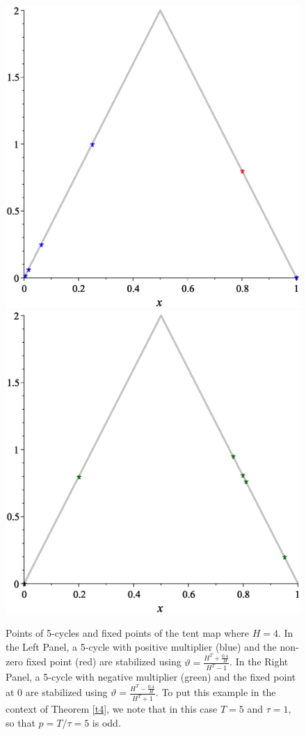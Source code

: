 \documentclass[12pt,a4paper]{amsart}
\begin{document}
\begin{figure}[ht!]
\centering
\includegraphics[scale=0.28]{Fig14a}
\hspace{1cm}
\includegraphics[scale=0.28]{Fig14b}
\caption{Points of 5-cycles and fixed points of the tent map where $H = 4$. In the Left Panel, a 5-cycle with positive multiplier (blue) and the non-zero fixed point (red) are stabilized using $\vartheta = \frac{H^T + \frac{0.4}{H}}{H^T - 1} $.  In the Right Panel, a 5-cycle with negative multiplier (green) and the fixed point at 0 are stabilized using $\vartheta = \frac{H^T - \frac{0.4}{H}}{H^T + 1}$.  To put this example in the context of Theorem \ref{t4}, we note that in this case $T = 5$ and $\tau = 1$, so that $p = T/\tau = 5$ is odd.}
\end{figure}
\end{document}
